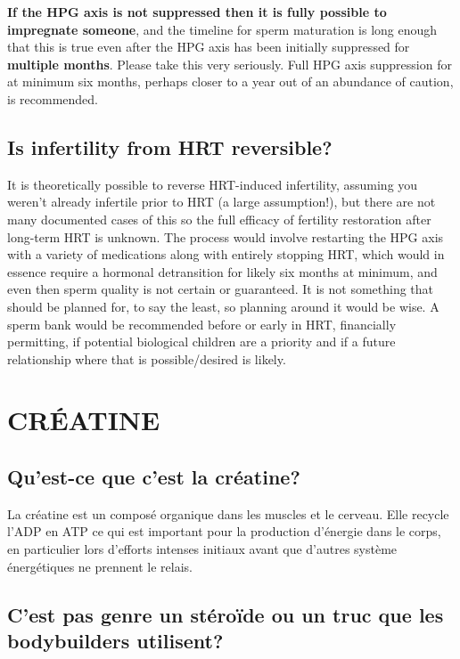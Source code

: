 \documentclass{article}
\begin{document}
\textbf{If the HPG axis is not suppressed then it is fully possible to impregnate someone}, and the timeline for sperm maturation is long enough that this is true even after the HPG axis has been initially suppressed for \textbf{multiple months}. Please take this very seriously. Full HPG axis suppression for at minimum six months, perhaps closer to a year out of an abundance of caution, is recommended.

\subsection{Is infertility from HRT reversible?}\label{11-43}

It is theoretically possible to reverse HRT-induced infertility, assuming you weren't already infertile prior to HRT (a large assumption!), but there are not many documented cases of this so the full efficacy of fertility restoration after long-term HRT is unknown. The process would involve restarting the HPG axis with a variety of medications along with entirely stopping HRT, which would in essence require a hormonal detransition for likely six months at minimum, and even then sperm quality is not certain or guaranteed. It is not something that should be planned for, to say the least, so planning around it would be wise. A sperm bank would be recommended before or early in HRT, financially permitting, if potential biological children are a priority and if a future relationship where that is possible/desired is likely.



\section{CRÉATINE}

\subsection{Qu'est-ce que c'est la créatine?}

La créatine est un composé organique dans les muscles et le cerveau. Elle recycle l'ADP en ATP ce qui est important pour la production d'énergie dans le corps, en particulier lors d'efforts intenses initiaux avant que d'autres système énergétiques ne prennent le relais. 

\subsection{C'est pas genre un stéroïde ou un truc que les bodybuilders utilisent?}
\end{document}
